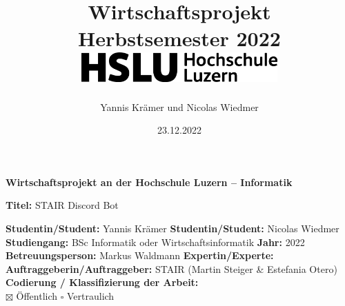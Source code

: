 \documentclass[a4paper, table]{article}
\title{
    {Wirtschaftsprojekt} \\
    \vspace{10mm}
    { Herbstsemester 2022 } \\
    \vspace{10mm}
    {\includegraphics[width=75mm]{img/hsluLogo2022.png}}
}
\author{Yannis Kr\"amer und Nicolas Wiedmer}
\date{23.12.2022}
\begin{document}
\maketitle

\clearpairofpagestyles
{}
\ohead{\leftmark}
\cfoot*{\pagemark}
\renewcommand*\thispagestyle{scrheadings}%

\newpage

\noindent
\fontsize{12}{14}
\textbf{Wirtschaftsprojekt an der Hochschule Luzern -- Informatik} \\ \vspace*{0.6cm}

\fontsize{10.95}{12}
\noindent
\textbf{Titel:} STAIR Discord Bot \\ \vspace*{0.2cm}

\noindent
\textbf{Studentin/Student:} Yannis Kr\"amer \newline \newline
\textbf{Studentin/Student:} Nicolas Wiedmer \newline \newline
\textbf{Studiengang:} BSc Informatik oder Wirtschaftsinformatik  \newline \newline
\textbf{Jahr:} 2022 \newline \newline
\textbf{Betreuungsperson:} Markus Waldmann \newline \newline
\textbf{Expertin/Experte:} \newline \newline
\textbf{Auftraggeberin/Auftraggeber:} STAIR (Martin Steiger \& Estefania Otero)\newline \newline \newline
\textbf{Codierung / Klassifizierung der Arbeit:}\\
$\boxtimes$ \"Offentlich
$\square$ Vertraulich


\end{document}
